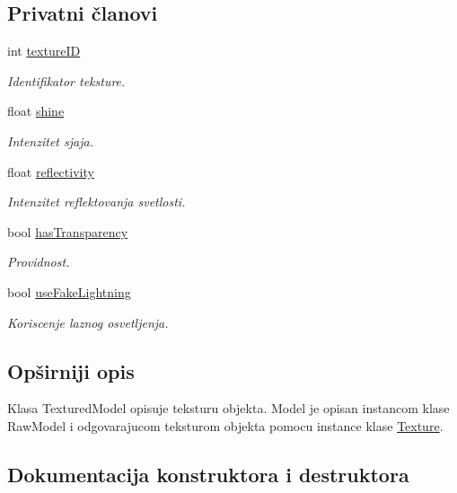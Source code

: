 \subsection*{Privatni članovi}
\begin{DoxyCompactItemize}
\item 
int \hyperlink{classtexture_1_1Texture_a7fe8db510038a2bd30a32676a20418bb}{texture\+ID}
\begin{DoxyCompactList}\small\item\em Identifikator teksture. \end{DoxyCompactList}\item 
float \hyperlink{classtexture_1_1Texture_abf70b1d80fb1df005deb34561467d740}{shine}
\begin{DoxyCompactList}\small\item\em Intenzitet sjaja. \end{DoxyCompactList}\item 
float \hyperlink{classtexture_1_1Texture_aa7e9fa291399f6f0e82ba94af7bc221f}{reflectivity}
\begin{DoxyCompactList}\small\item\em Intenzitet reflektovanja svetlosti. \end{DoxyCompactList}\item 
bool \hyperlink{classtexture_1_1Texture_ae21644c129b699d28722f86fe098b028}{has\+Transparency}
\begin{DoxyCompactList}\small\item\em Providnost. \end{DoxyCompactList}\item 
bool \hyperlink{classtexture_1_1Texture_ac8ea906062f8a7c558134072955af52f}{use\+Fake\+Lightning}
\begin{DoxyCompactList}\small\item\em Koriscenje laznog osvetljenja. \end{DoxyCompactList}\end{DoxyCompactItemize}


\subsection{Opširniji opis}
Klasa Textured\+Model opisuje teksturu objekta. Model je opisan instancom klase Raw\+Model i odgovarajucom teksturom objekta pomocu instance klase \hyperlink{classtexture_1_1Texture}{Texture}. 

\subsection{Dokumentacija konstruktora i destruktora}
\mbox{\label{classtexture_1_1Texture_a3de34511b42d770506bddaa58875eb3d}} 
